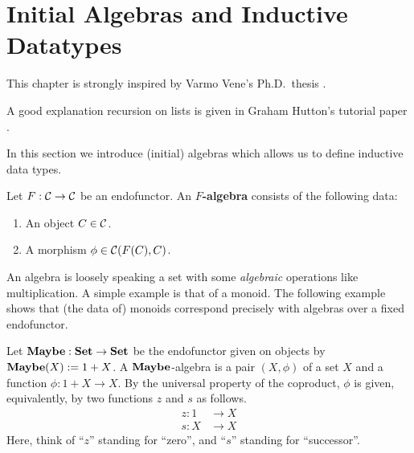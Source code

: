 
\section{Initial Algebras and Inductive Datatypes}
\label{sec:initial-algs}

\begin{reading*}
  This chapter is strongly inspired by Varmo Vene's Ph.D.\ thesis \cite[Chapter 2]{vene_phd}.

  A good explanation recursion on lists is given in Graham Hutton's tutorial paper \cite{DBLP:journals/jfp/Hutton99}.
\end{reading*}

In this section we introduce (initial) algebras which allows us to define inductive data types.

\begin{dfn} Let $F:\mathcal{C}\to \mathcal{C}$ be an endofunctor. An \textbf{$F$-algebra} consists of the following data:
\begin{enumerate}
\item An object $C\in \mathcal{C}$.
\item A morphism $\phi \in {\mathcal{C}}(F(C),C)$.
\end{enumerate}
\end{dfn}

\begin{intu} An algebra is loosely speaking a set with some \textit{algebraic} operations like multiplication. A simple example is that of a monoid. The following example shows that (the data of) monoids correspond precisely with algebras over a fixed endofunctor.
\end{intu}


\begin{exa}
 Let $\mathbf{Maybe} : \mathbf{Set} \to \mathbf{Set}$ be the endofunctor given on objects by $\mathbf{Maybe}(X) := 1 + X$. 
 A $\mathbf{Maybe}$-algebra is a pair $(X,\phi)$ of a set $X$ and a function $\phi : 1 + X \to X$.
 By the universal property of the coproduct, $\phi$ is given, equivalently,
 by two functions $z$ and $s$ as follows.
 \begin{align*}
    z : 1 &\to X
    \\
    s : X &\to X
 \end{align*}
Here, think of ``$z$'' standing for ``zero'', and ``$s$'' standing for ``successor''.
\end{exa}


